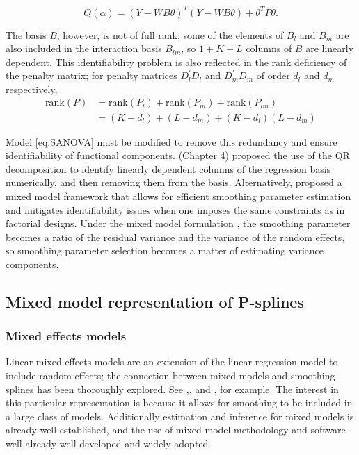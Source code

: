 \documentclass[12pt]{article}
\newcommand{\ms}{\scriptscriptstyle}
\theoremstyle{definition}
\begin{document}
\begin{equation} \label{eq:PSANOVA-objective-function}
Q\left(\alpha\right) = \left( Y - WB\theta \right)^T\left( Y - WB\theta \right) +  \theta^T P \theta.
\end{equation}


The basis $B$, however, is not of full rank; some of the elements of $B_l$ and $B_m$ are also included in the interaction basis $B_{lm}$, so $1 + K+ L$ columns of $B$ are linearly dependent. This identifiability problem is also reflected in the rank deficiency of the penalty matrix; for penalty matrices $D_l^\prime D_l$ and $D_m^\prime D_m$ of order $d_{\ms l}$ and $d_{\ms m}$ respectively, 
\begin{align*}
\mbox{rank}\left(P\right) &=  \mbox{rank}\left(P_l\right) + \mbox{rank}\left(P_m\right) + \mbox{rank}\left(P_{lm}\right) \\
&= \left(K - d_{\ms l}\right) + \left( L - d_{\ms m}\right) +  \left(K - d_{\ms l}\right)\left( L - d_{\ms m}\right)
\end{align*}

Model \ref{eq:SANOVA} must be modified to remove this redundancy and ensure identifiability of functional components. \citet{wood2017generalized} (Chapter 4) proposed the use of the QR decomposition to identify linearly dependent columns of the regression basis numerically, and then removing them from the basis. Alternatively, \citet{lee2011p} proposed a mixed model framework that allows for efficient smoothing parameter estimation and mitigates identifiability issues when one imposes the same constraints as in factorial designs. Under the mixed model formulation , the smoothing parameter becomes a ratio of the residual variance and the variance of the random effects, so smoothing parameter selection becomes a matter of estimating  variance components. 

\subsection{Mixed model representation of  P-splines}

\subsubsection {Mixed effects models}

Linear mixed effects models are an extension of the linear regression model to include random effects; the connection between mixed models and smoothing splines has been thoroughly explored. See \citet{},\citet{}, and \citet{}, for example. The interest in this particular representation is because it allows for smoothing to be included in a large class of models. Additionally estimation and inference for mixed models is already well established, and the use of mixed model methodology and software well already well developed and widely adopted.
\end{document}
